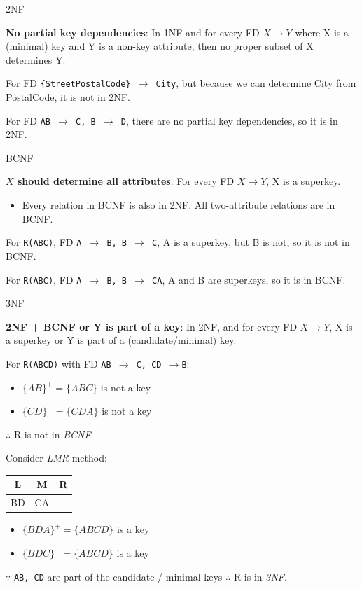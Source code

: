 \begin{definition}
    {2NF}

    \textbf{No partial key dependencies}: In 1NF and for every FD $X \to Y$ where X is a (minimal) key and Y is a non-key attribute, then no proper subset of X determines Y.

    \tcblower

    For FD \texttt{\{StreetPostalCode\} $\rightarrow$ City}, but because we can determine City from PostalCode, it is not in 2NF.

    For FD \texttt{AB $\rightarrow$ C, B $\rightarrow$ D}, there are no partial key dependencies, so it is in 2NF.
\end{definition}

\begin{definition}
    {BCNF}

    \textbf{$X$ should determine all attributes}: For every FD $X \to Y$, X is a superkey.

    \begin{itemize}
        \item Every relation in BCNF is also in 2NF. All two-attribute relations are in BCNF.
    \end{itemize}



    \tcblower

    For \texttt{R(ABC)}, FD \texttt{A $\rightarrow$ B, B $\rightarrow$ C}, A is a superkey, but B is not, so it is not in BCNF.

    For \texttt{R(ABC)}, FD \texttt{A $\rightarrow$ B, B $\rightarrow$ CA}, A and B are superkeys, so it is in BCNF.
\end{definition}

\begin{definition}
    {3NF}

    \textbf{2NF + BCNF or Y is part of a key}: In 2NF, and for every FD $X \to Y$, X is a superkey or Y is part of a (candidate/minimal) key.

    \tcblower

    For \texttt{R(ABCD)} with FD \texttt{AB $\rightarrow$ C, CD $\rightarrow$B}:
    \begin{itemize}
        \item $\{AB\}^+=\{ABC\}$ is not a key
        \item $\{CD\}^+=\{CDA\}$ is not a key
    \end{itemize}
    $\therefore$ R is not in \textit{BCNF}.

    Consider \textit{LMR} method:
    \begin{tabular}{c|c|c}
        L  & M  & R \\
        \hline
        BD & CA &   \\
    \end{tabular}
    \begin{itemize}
        \item $\{BDA\}^+=\{ABCD\}$ is a key
        \item $\{BDC\}^+=\{ABCD\}$ is a key
    \end{itemize}
    $\because$ \texttt{AB, CD} are part of the candidate / minimal keys
    $\therefore$ R is in \textit{3NF}.
\end{definition}


